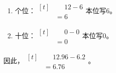 {\begin{enumerate}[leftmargin=1.7em,itemsep=5pt,topsep=0pt]
\item 个位：\(\begin{aligned}[t]&\phantom{={}}12-6\\&=6\end{aligned}\)\quad 本位写6。
\item 十位：\(\begin{aligned}[t]&\phantom{={}}0-0\\&=0\end{aligned}\)\quad 本位写0。
\end{enumerate}
\par\smallskip
因此，\(\begin{aligned}[t]&\phantom{={}}12.96-6.2\\&=6.76\end{aligned}\)。
\par\medskip

}
